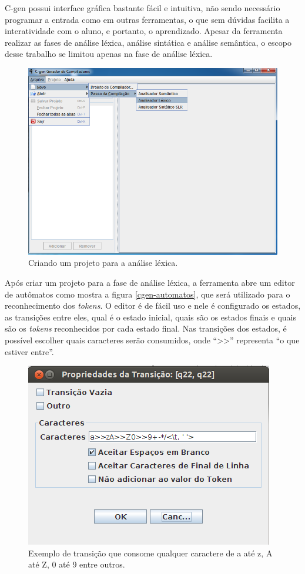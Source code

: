 \newpage
C-gen possui interface gráfica bastante fácil e intuitiva, não sendo necessário programar a entrada como em outras ferramentas, o que sem dúvidas facilita a interatividade com o aluno, e portanto, o aprendizado. Apesar da ferramenta realizar as fases de análise léxica, análise sintática e análise semântica, o escopo desse trabalho se limitou apenas na fase de análise léxica.

\begin{figure}[ht!]
	\centering
	\includegraphics[scale=0.5]{imgs/cgen2.png}
	\caption{Criando um projeto para a análise léxica.}
	\label{cgen-analise-lexica}
\end{figure}

Após criar um projeto para a fase de análise léxica, a ferramenta abre um editor de autômatos como mostra a figura \ref{cgen-automatos}, que será utilizado para o reconhecimento dos \textit{tokens}. O editor é de fácil uso e nele é configurado os estados, as transições entre eles, qual é o estado inicial, quais são os estados finais e quais são os \textit{tokens} reconhecidos por cada estado final. Nas transições dos estados, é possível escolher quais caracteres serão consumidos, onde ``>>'' representa ``o que estiver entre''.

\begin{figure}[ht!]
	\centering
	\includegraphics[scale=0.59]{imgs/cgen5.png}
	\caption{Exemplo de transição que consome qualquer caractere de a até z, A até Z, 0 até 9 entre outros.}
	\label{cgen-transicoes}
\end{figure}

